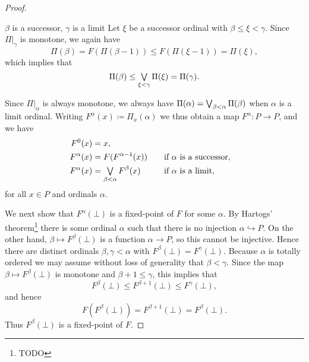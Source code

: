 \documentclass[a4paper, 11pt, article, danish, oneside]{memoir}
\DeclareMathOperator*{\smallbigvee}{\textstyle\bigvee}
\DeclareMathOperator*{\bigjoin}{\mathchoice
    {\smallbigvee}%
    {\bigvee}%
    {\bigvee}%
    {\bigvee}%
}
\newcommand{\defeq}{\coloneqq}
\newcommand{\injto}{\hookrightarrow}
\begin{document}
\begin{proof}
\begin{proofsec}
        \item[$\beta$ is a successor, $\gamma$ is a limit]
        Let $\xi$ be a successor ordinal with $\beta \leq \xi < \gamma$. Since $\Pi|_\gamma$ is monotone, we again have
        \begin{equation*}
            \Pi(\beta)
                = F(\Pi(\beta-1))
                \leq F(\Pi(\xi-1))
                = \Pi(\xi),
        \end{equation*}
        which implies that
        \begin{equation*}
            \Pi(\beta)
                \leq \bigjoin_{\xi < \gamma} \Pi(\xi)
                = \Pi(\gamma).
        \end{equation*}
    \end{proofsec}
    Since $\Pi|_\alpha$ is always monotone, we always have $\Pi(\alpha) = \bigjoin_{\beta < \alpha} \Pi(\beta)$ when $\alpha$ is a limit ordinal. Writing $F^\alpha(x) \defeq \Pi_x(\alpha)$ we thus obtain a map $F^\alpha \colon P \to P$, and we have
    \begin{alignat*}{2}
        F^0(x)
            &= x, \\
        F^\alpha(x)
            &= F(F^{\alpha-1}(x))
            \quad &&\text{if $\alpha$ is a successor}, \\
        F^\alpha(x)
            &= \bigjoin_{\beta < \alpha} F^\beta(x)
            \quad &&\text{if $\alpha$ is a limit},
    \end{alignat*}
    for all $x \in P$ and ordinals $\alpha$.

    We next show that $F^\alpha(\bot)$ is a fixed-point of $F$ for some $\alpha$. By Hartogs' theorem\footnote{TODO} there is some ordinal $\alpha$ such that there is no injection $\alpha \injto P$. On the other hand, $\beta \mapsto F^\beta(\bot)$ is a function $\alpha \to P$, so this cannot be injective. Hence there are distinct ordinals $\beta,\gamma < \alpha$ with $F^\beta(\bot) = F^\gamma(\bot)$. Because $\alpha$ is totally ordered we may assume without loss of generality that $\beta < \gamma$. Since the map $\beta \mapsto F^\beta(\bot)$ is monotone and $\beta + 1 \leq \gamma$, this implies that
    \begin{equation*}
        F^\beta(\bot)
            \leq F^{\beta+1}(\bot)
            \leq F^\gamma(\bot),
    \end{equation*}
    and hence
    \begin{equation*}
        F(F^\beta(\bot))
            = F^{\beta+1}(\bot)
            = F^\beta(\bot).
    \end{equation*}
    Thus $F^\beta(\bot)$ is a fixed-point of $F$.


\end{proof}
\end{document}
